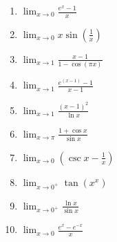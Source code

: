 \documentclass{exercises}
\begin{document}
\begin{enumerate}[resume]
\item \techrequired $\lim_{x\to0}\frac{e^{x}-1}{x}$
\item \techrequired $\lim_{x\to0}x\sin(\frac{1}{x})$
\item \techrequired $\lim_{x\to1}\frac{x-1}{1-\cos(\pi x)}$
\item \techrequired $\lim_{x\to1}\frac{e^{(x-1)}-1}{x-1}$
\item \techrequired $\lim_{x\to1}\frac{{(x-1)}^{2}}{\ln x}$
\item \techrequired $\lim_{x\to \pi}\frac{1+\cos x}{\sin x}$
\item \techrequired $\lim_{x\to0}(\csc x-\frac{1}{x})$
\item \techrequired $\lim_{x\to0^{+}}\tan(x^{x})$
\item \techrequired $\lim_{x\to0^{+}}\frac{\ln x}{\sin x}$
\item \techrequired $\lim_{x\to0}\frac{e^{x}-e^{-x}}{x}$
\end{enumerate}
\end{document}
